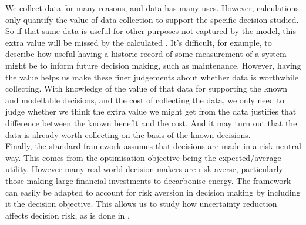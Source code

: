 We collect data for many reasons, and data has many uses. However,  calculations only quantify the value of data collection to support the specific decision studied. So if that same data is useful for other purposes not captured by the model, this extra value will be missed by the calculated . It's difficult, for example, to describe how useful having a historic record of some measurement of a system might be to inform future decision making, such as maintenance. However, having the  value helps us make these finer judgements about whether data is worthwhile collecting. With knowledge of the value of that data for supporting the known and modellable decisions, and the cost of collecting the data, we only need to judge whether we think the extra value we might get from the data justifies that difference between the known benefit and the cost. And it may turn out that the data is already worth collecting on the basis of the known decisions.\\

Finally, the standard  framework assumes that decisions are made in a risk-neutral way. This comes from the optimisation objective being the expected/average utility. However many real-world decision makers are risk averse, particularly those making large financial investments to decarbonise energy. The framework can easily be adapted to account for risk aversion in decision making by including it the decision objective. This allows us to study how uncertainty reduction affects decision risk, as is done in .\\

